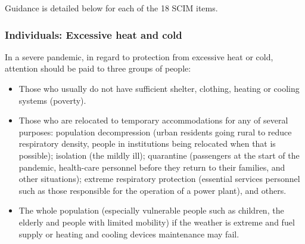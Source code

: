 \documentclass[12pt, a4]{scrartcl}
\begin{document}
Guidance is detailed below for each of the 18 SCIM items.
\subsubsection{Individuals: Excessive heat and cold}
In a severe pandemic, in regard to protection from excessive heat or cold, attention should be paid to three groups of people:
\begin{itemize}
	\item Those who usually do not have sufficient shelter, clothing, heating or cooling systems (poverty).
	\item Those who are relocated to temporary accommodations for any of several purposes: population decompression (urban residents going rural to reduce respiratory density, people in institutions being relocated when that is possible); isolation (the mildly ill); quarantine (passengers at the start of the pandemic, health-care personnel before they return to their families, and other situations); extreme respiratory protection (essential services personnel such as those responsible for the operation of a power plant), and others.
	\item The whole population (especially vulnerable people such as children, the elderly and people with limited mobility) if the weather is extreme and fuel supply or heating and cooling devices maintenance may fail.
\end{itemize}
\end{document}
